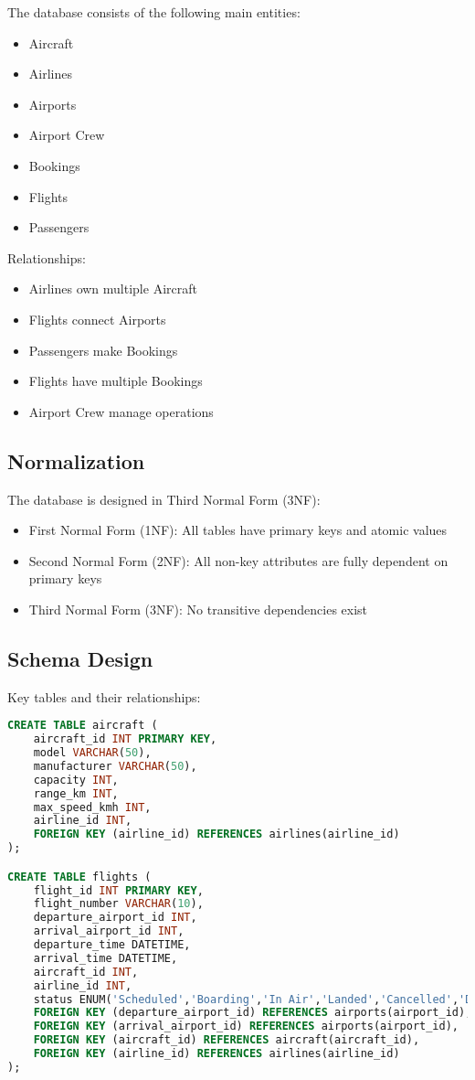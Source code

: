 \documentclass[a4paper,12pt]{article}
\begin{document}
\nopagebreak[4]
The database consists of the following main entities:
\begin{itemize}
    \item Aircraft
    \item Airlines
    \item Airports
    \item Airport Crew
    \item Bookings
    \item Flights
    \item Passengers
\end{itemize}

Relationships:
\begin{itemize}
    \item Airlines own multiple Aircraft
    \item Flights connect Airports
    \item Passengers make Bookings
    \item Flights have multiple Bookings
    \item Airport Crew manage operations
\end{itemize}

\subsection{Normalization}
The database is designed in Third Normal Form (3NF):
\begin{itemize}
    \item First Normal Form (1NF): All tables have primary keys and atomic values
    \item Second Normal Form (2NF): All non-key attributes are fully dependent on primary keys
    \item Third Normal Form (3NF): No transitive dependencies exist
\end{itemize}

\subsection{Schema Design}
Key tables and their relationships:
\begin{lstlisting}[language=SQL]
CREATE TABLE aircraft (
    aircraft_id INT PRIMARY KEY,
    model VARCHAR(50),
    manufacturer VARCHAR(50),
    capacity INT,
    range_km INT,
    max_speed_kmh INT,
    airline_id INT,
    FOREIGN KEY (airline_id) REFERENCES airlines(airline_id)
);

CREATE TABLE flights (
    flight_id INT PRIMARY KEY,
    flight_number VARCHAR(10),
    departure_airport_id INT,
    arrival_airport_id INT,
    departure_time DATETIME,
    arrival_time DATETIME,
    aircraft_id INT,
    airline_id INT,
    status ENUM('Scheduled','Boarding','In Air','Landed','Cancelled','Delayed'),
    FOREIGN KEY (departure_airport_id) REFERENCES airports(airport_id),
    FOREIGN KEY (arrival_airport_id) REFERENCES airports(airport_id),
    FOREIGN KEY (aircraft_id) REFERENCES aircraft(aircraft_id),
    FOREIGN KEY (airline_id) REFERENCES airlines(airline_id)
);
\end{lstlisting}
\end{document}
